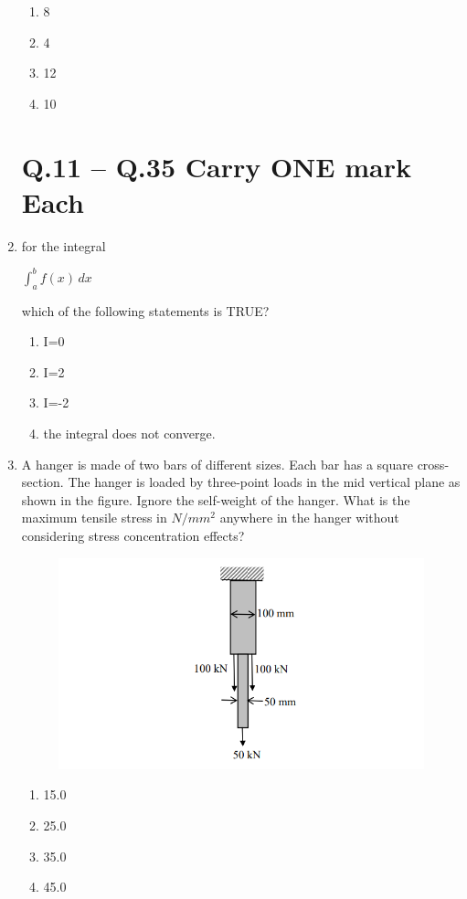 \documentclass[journal,12pt,onecolumn]{IEEEtran}
\theoremstyle{remark}
\begin{document}
\begin{enumerate}
\begin{enumerate}
\item 8
\item 4
\item 12
\item 10
\end{enumerate}

\section*{Q.11 – Q.35 Carry ONE mark Each}

\item for the integral \\
\begin{center}
\Large\textbf{$\int_{a}^{b} f(x) \,dx$}
\end{center}

which of the following statements is TRUE?

\hfill{}
\begin{enumerate}
\item I=0
\item I=2
\item I=-2
\item the integral does not converge.
\end{enumerate}

\item A hanger is made of two bars of different sizes. Each bar has a square cross-section. The hanger is loaded by three-point loads in the mid vertical plane as shown in the figure. Ignore the self-weight of the hanger. What is the maximum tensile stress in $N/mm^2$ anywhere in the hanger without considering stress concentration effects?

\hfill{}
\begin{figure}[H]
\centering
\includegraphics[width=0.5\linewidth]{figs/q12.png}
\caption*{}
\label{fig:Q.12}
\end{figure}

\begin{enumerate}
\item 15.0
\item 25.0
\item 35.0
\item 45.0
\end{enumerate}


\end{enumerate}
\end{document}
